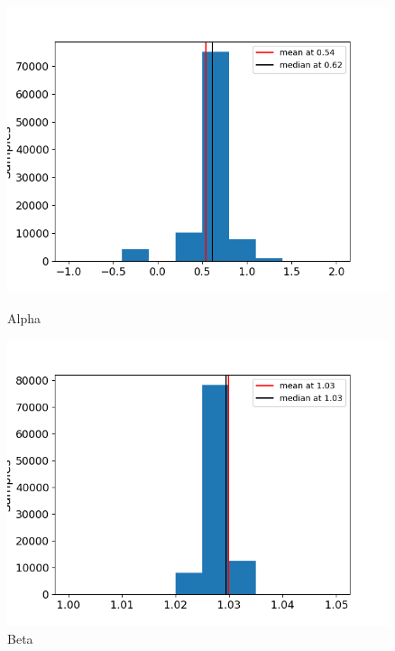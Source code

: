 \documentclass[a4paper,11pt]{article}
\theoremstyle{mytheor}
\begin{document}
\begin{figure}[H]
    \centering
    \begin{minipage}{0.49\textwidth}
        \centering
        \includegraphics[width=0.995\textwidth]{time-series/autoreg_alphac.png} %
        \caption{Alpha}
        \label{fig:aa}
    \end{minipage}\hfill
    \begin{minipage}{0.49\textwidth}
        \centering
        \includegraphics[width=0.995\textwidth]{time-series/autoreg_betac.png} %
        \caption{Beta}
        \label{fig:ab}
    \end{minipage}
    
\end{figure}    
        
\end{document}
